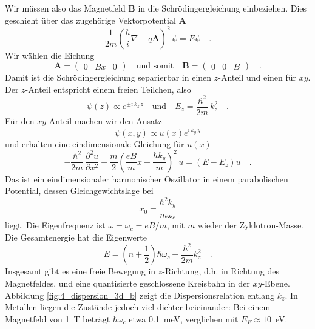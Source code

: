 Wir müssen also das Magnetfeld $\mathbf{B}$ in die Schrödingergleichung einbeziehen. Dies geschieht über das zugehörige Vektorpotential $\mathbf{A}$
\begin{equation}
   \frac{1}{2m} \left( \frac{\hbar}{i} \nabla - q \mathbf{A}  \right)^2 \, \psi = E \psi \quad .
\end{equation}
Wir wählen die Eichung
\begin{equation}
   \mathbf{A} = \begin{pmatrix}
      0 & B x & 0
   \end{pmatrix}
   \quad \text{und somit} \quad
   \mathbf{B} = \begin{pmatrix}
      0 & 0 & B
   \end{pmatrix} \quad .
\end{equation}
Damit ist die Schrödingergleichung separierbar in einen $z$-Anteil und einen für $xy$. Der $z$-Anteil entspricht einem freien Teilchen, also 
\begin{equation}
    \psi(z) \propto e^{ \pm i \, k_z \, z}    \quad \text{und} \quad
    E_z = \frac{\hbar^2}{2m} \, k_z^2 \quad .
\end{equation}
Für den $xy$-Anteil machen wir den Ansatz
\begin{equation}
   \psi(x,y) \propto u(x) e^{i \, k_y \, y}
\end{equation}
und erhalten eine eindimensionale Gleichung für $u(x)$
\begin{equation}
   - \frac{\hbar^2}{2m} \, \frac{\partial^2 u }{\partial x^2} + 
   \frac{m}{2} \left(
 \frac{eB}{m} x - \frac{\hbar k_y}{m}
   \right)^2 \, u = 
   (E - E_z) u \quad .
\end{equation}
Das ist ein eindimensionaler harmonischer Oszillator in einem parabolischen Potential,  dessen Gleichgewichtslage bei 
\begin{equation}
   x_0 = \frac{\hbar^2 k_y}{m \omega_c}
\end{equation}
liegt. Die Eigenfrequenz ist $\omega = \omega_c = e B / m$, mit $m$ wieder der Zyklotron-Masse. 
Die Gesamtenergie hat die Eigenwerte
\begin{equation}
   E = \left( n + \frac{1}{2} \right) \hbar \omega_c + \frac{\hbar^2}{2m} k_z^2 \quad .
\end{equation}
Insgesamt gibt es eine freie Bewegung in $z$-Richtung, d.h. in Richtung des Magnetfeldes, und eine quantisierte geschlossene Kreisbahn in der $xy$-Ebene. Abbildung \ref{fig:4_dispersion_3d_b} zeigt die Dispersionsrelation entlang $k_z$. In Metallen liegen die Zustände jedoch viel dichter beieinander: Bei einem Magnetfeld von 1~T beträgt $\hbar \omega_c$ etwa 0.1~meV, verglichen mit $E_F \approx 10$~eV.

